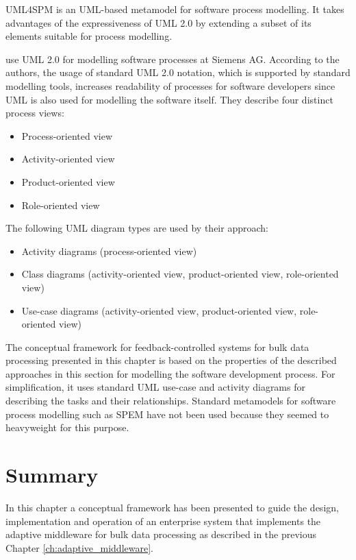 \ac{UML4SPM} is an \ac{UML}-based metamodel for software process modelling. It takes advantages of the expressiveness of \ac{UML} 2.0 by extending a subset of its elements suitable for process modelling.

\cite{Dietrich:2013aa} use \ac{UML} 2.0 for modelling software processes at Siemens AG. According to the authors, the usage of standard UML 2.0 notation, which is supported by standard modelling tools, increases readability of processes for software developers since UML is also used for modelling the software itself.
They describe four distinct process views: 
\begin{itemize}
	\item Process-oriented view
	\item Activity-oriented view
	\item Product-oriented view
	\item Role-oriented view
\end{itemize}

The following UML diagram types are used by their approach: 
\begin{itemize}
	\item Activity diagrams (process-oriented view)
	\item Class diagrams (activity-oriented view, product-oriented view, role-oriented view)
	\item Use-case diagrams (activity-oriented view, product-oriented view, role-oriented view)
\end{itemize} 

The conceptual framework for feedback-controlled systems for bulk data processing presented in this chapter is based on the properties of the described approaches in this section for modelling the software development process. For simplification, it uses standard \ac{UML} use-case and activity diagrams for describing the tasks and their relationships. Standard metamodels for software process modelling such as \ac{SPEM} have not been used because they seemed to heavyweight for this purpose.

\section{Summary}
\label{sec:ch6_summary}
In this chapter a conceptual framework has been presented to guide the design, implementation and operation of an enterprise system that implements the adaptive middleware for bulk data processing as described in the previous Chapter \ref{ch:adaptive_middleware}.

